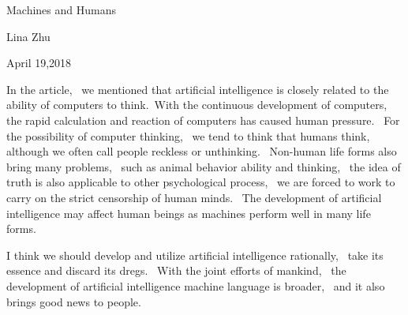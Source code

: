 \documentclass{article}
\begin{document}
	
	
	
	\begin{center}
		 Machines and Humans
	\end{center}
	\begin{center}
	Lina Zhu
	\end{center}
	\begin{center}
		April 19,2018
	\end{center}
	
	\par   In the article,~ we mentioned that artificial intelligence is closely related to
	the ability of computers to think.~With the continuous development of computers,~ the
	rapid calculation and reaction of computers has caused human pressure.~ For the possibility 
	of computer thinking,~ we tend to think that humans think,~ although we often call people 
	reckless or unthinking.~ Non-human life forms also bring many problems,~ such as animal 
	behavior ability and thinking, ~the idea of truth is also applicable to other psychological
	process,~ we are forced to work to carry on the strict censorship of human minds.~ The
	development of artificial intelligence may affect human beings as machines perform well
	in many life forms.
        \par I think we should develop and utilize artificial intelligence rationally,~ take its 
	essence and discard its dregs. ~With the joint efforts of mankind,~ the development of
	artificial intelligence machine language is broader, ~and it also brings good news to
	people.
\end{document}
